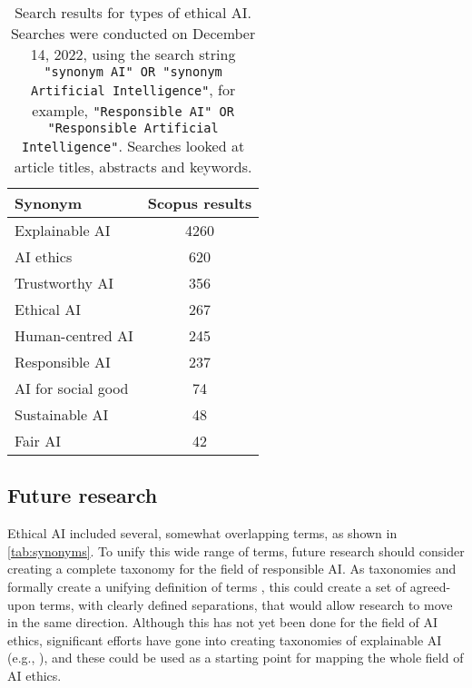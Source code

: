\begin{table}[ht]
    \centering
    \caption[Search results for types of ethical AI]{Search results for types of ethical AI. Searches were conducted on December 14, 2022, using the search string \texttt{"synonym AI" OR "synonym Artificial Intelligence"}, for example, \texttt{"Responsible AI" OR "Responsible Artificial Intelligence"}. Searches looked at article titles, abstracts and keywords.}
    \label{tab:synonyms}
    \begin{tabular}{p{}c}
    \toprule
        \textbf{Synonym} & \textbf{Scopus results} \\
    \midrule
        Explainable AI & 4260 \\
        AI ethics & 620 \\
        Trustworthy AI & 356 \\
        Ethical AI & 267 \\
        Human-centred AI & 245 \\
        Responsible AI & 237 \\
        AI for social good & 74 \\
        Sustainable AI & 48 \\
        Fair AI & 42 \\
    \bottomrule
    \end{tabular}
\end{table}


\subsection{Future research}
Ethical AI included several, somewhat overlapping terms, as shown in \autoref{tab:synonyms}. To unify this wide range of terms, future research should consider creating a complete taxonomy for the field of responsible AI. As taxonomies  \parencite{Kundisch_2022} and formally create a unifying definition of terms \parencite{Uschold_1996}, this could create a set of agreed-upon terms, with clearly defined separations, that would allow research to move in the same direction. Although this has not yet been done for the field of AI ethics, significant efforts have gone into creating taxonomies of explainable AI (e.g., \cite{BarredoArrieta_2020,Clinciu_2019,Graziani_2022,Bellucci_2021,Brennen_2020}), and these could be used as a starting point for mapping the whole field of AI ethics.


